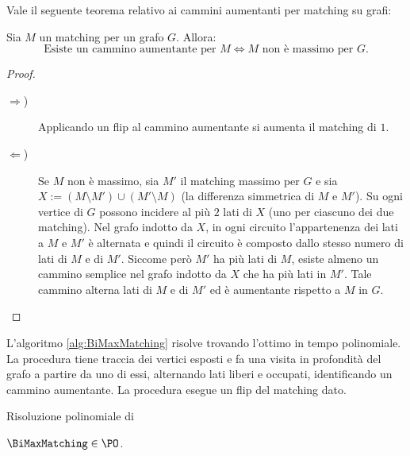 Vale il seguente teorema relativo ai cammini aumentanti per matching su grafi:
\begin{theorem}
	Sia $M$ un matching per un grafo $G$. Allora:
	\begin{equation*}
		\text{Esiste un cammino aumentante per $M$} \iff \text{$M$ non è massimo per $G$.}
	\end{equation*}
\end{theorem}
\begin{proof}~
	\begin{description}
		\item[$\Rightarrow$)] Applicando un flip al cammino aumentante si aumenta il matching di $1$.
		\item[$\Leftarrow$)] Se $M$ non è massimo, sia $M'$ il matching massimo per $G$ e sia $X:=(M\setminus M')\cup(M'\setminus M)$ (la differenza simmetrica di $M$ e $M'$).
			Su ogni vertice di $G$ possono incidere al più $2$ lati di $X$ (uno per ciascuno dei due matching).
			Nel grafo indotto da $X$, in ogni circuito l'appartenenza dei lati a $M$ e $M'$ è alternata e quindi il circuito è composto dallo stesso numero di lati di $M$ e di $M'$.
			Siccome però $M'$ ha più lati di $M$, esiste almeno un cammino semplice nel grafo indotto da $X$ che ha più lati in $M'$.
			Tale cammino alterna lati di $M$ e di $M'$ ed è aumentante rispetto a $M$ in $G$.
	\end{description}
\end{proof}

L'algoritmo \ref{alg:BiMaxMatching} risolve \BiMaxMatching trovando l'ottimo in tempo polinomiale.
La procedura \FindAugmenting tiene traccia dei vertici esposti e fa una visita in profondità del grafo a partire da uno di essi, alternando lati liberi e occupati, identificando un cammino aumentante.
La procedura \Flip esegue un flip del matching dato.

\begin{algorithm}
	
	\caption{Risoluzione polinomiale di \BiMaxMatching}
	\label{alg:BiMaxMatching}
\end{algorithm}

\begin{corollario}
	$\BiMaxMatching\in\PO$.
\end{corollario}

